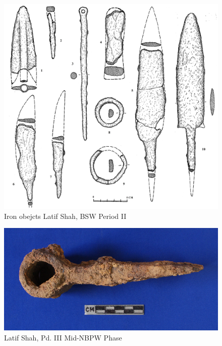 \begin{figure}[H]
\includegraphics[scale=0.55]{images/chapter-4/fig012.jpg}
\caption{Iron obejcts Latif Shah, BSW Period II}\label{chapter-4-fig12}
\end{figure}

\begin{figure}[H]
\renewcommand{\thefigure}{13A}
\includegraphics[scale=1.4]{images/chapter-4/fig013A.jpg}
\caption{Latif Shah, Pd. III Mid-NBPW Phase}\label{chapter-4-fig13A}
\end{figure}

